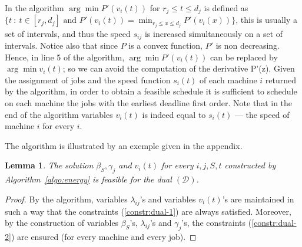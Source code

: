 \documentclass[11pt,a4paper]{article}
\newtheorem{lemma}{Lemma}
\begin{document}
In the algorithm $\arg \min P'(v_{i}(t))$ for $r_{j} \leq t \leq d_{j}$ is defined as $ \{ t \: : \: t\in [r_{j},d_{j}] \mbox{ and } P'(v_i(t)) = \min_{r_{j} \leq x \leq d_{j}} P'(v_i(x)) \}$, this is usually a
set of intervals, and thus the speed $s_{ij}$ is increased simultaneously on a set of intervals.
Notice also that since $P$ is a convex function,  $P'$ is non decreasing. Hence, in line 5 of the algorithm,
$\arg \min P'(v_{i}(t))$ can be replaced by $\arg \min v_{i}(t)$; so we can avoid the computation of 
the derivative P'(z).
Given the assignment of jobs and the speed function $s_i(t)$ of each machine $i$ returned by the algorithm, in order to obtain a feasible schedule it is sufficient to schedule on each machine the jobs with the earliest deadline first order.
Note that in the end of the algorithm variables $v_{i}(t)$ is indeed equal to 
$s_{i}(t)$ --- the speed of machine $i$ for every $i$. 

The algorithm is illustrated by an exemple given in the appendix. 

\begin{lemma}		\label{lem:approx-feasible}
The solution $\beta_{S}, \gamma_{j}$ and $v_{i}(t)$ for every $i,j,S,t$ constructed 
by Algorithm~\ref{algo:energy} is feasible for the dual $(\mathcal{D})$. 
\end{lemma}
\begin{proof}
By the algorithm, variables $\lambda_{ij}$'s and variables $v_{i}(t)$'s are maintained 
in such a way that the constraints (\ref{constr:dual-1}) are always satisfied. 
Moreover, by the construction of variables 
$\beta_{S}$'s, $\lambda_{ij}$'s and $\gamma_{j}$'s, the constraints
(\ref{constr:dual-2}) are ensured (for every machine and every job).  
\end{proof}
\end{document}
